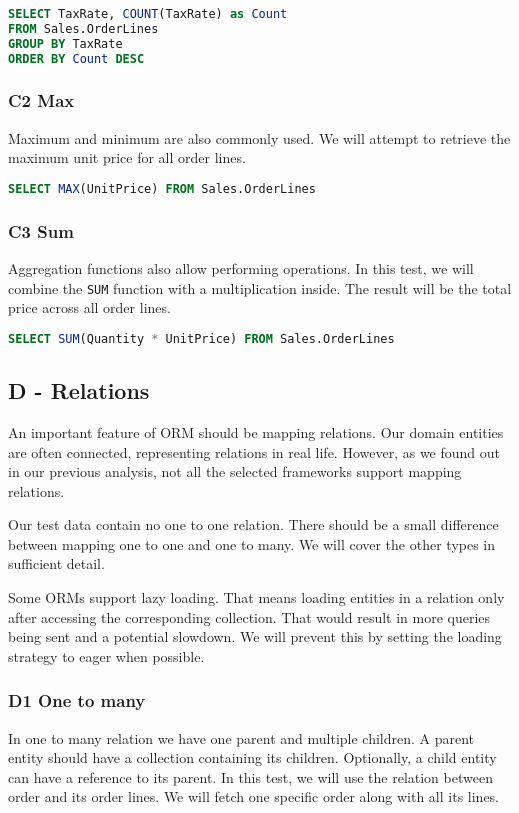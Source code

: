 \begin{lstlisting}[language=SQL]
SELECT TaxRate, COUNT(TaxRate) as Count 
FROM Sales.OrderLines 
GROUP BY TaxRate 
ORDER BY Count DESC
\end{lstlisting}

\subsubsection*{C2 Max}
Maximum and minimum are also commonly used. We will attempt to retrieve the maximum unit price for all order lines.

\begin{lstlisting}[language=SQL]
SELECT MAX(UnitPrice) FROM Sales.OrderLines
\end{lstlisting}

\subsubsection*{C3 Sum}
Aggregation functions also allow performing operations. In this test, we will combine the \texttt{SUM} function with a multiplication inside. The result will be the total price across all order lines.
\begin{lstlisting}[language=SQL]
SELECT SUM(Quantity * UnitPrice) FROM Sales.OrderLines
\end{lstlisting}

\subsection{D - Relations}
An important feature of ORM should be mapping relations. Our domain entities are often connected, representing relations in real life.
However, as we found out in our previous analysis, not all the selected frameworks support mapping relations. 

Our test data contain no one to one relation. There should be a small difference between mapping one to one and one to many. We will cover the other types in sufficient detail.

Some ORMs support lazy loading. That means loading entities in a relation only after accessing the corresponding collection. That would result in more queries being sent and a potential slowdown.
We will prevent this by setting the loading strategy to eager when possible.

\subsubsection*{D1 One to many}
In one to many relation we have one parent and multiple children. A parent entity should have a collection containing its children. Optionally, a child entity can have a reference to its parent.
In this test, we will use the relation between order and its order lines. We will fetch one specific order along with all its lines.

